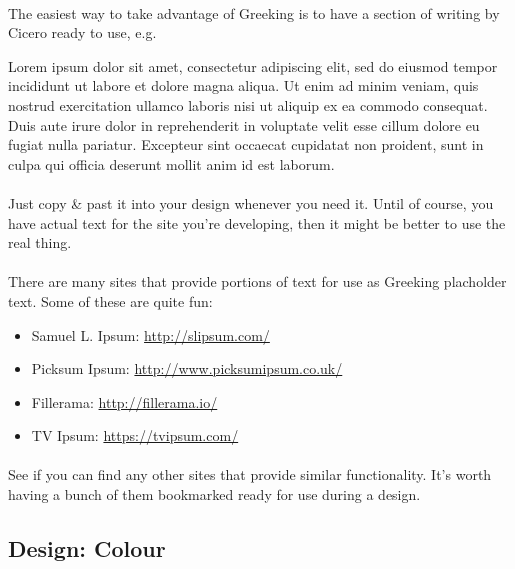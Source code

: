 \documentclass[10pt, a4paper, twosize]{article}
\begin{document}
\paragraph{} The easiest way to take advantage of Greeking is to have a section of writing by Cicero ready to use, e.g. 

\begin{framed}
Lorem ipsum dolor sit amet, consectetur adipiscing elit, sed do eiusmod tempor incididunt ut labore et dolore magna aliqua. Ut enim ad minim veniam, quis nostrud exercitation ullamco laboris nisi ut aliquip ex ea commodo consequat. Duis aute irure dolor in reprehenderit in voluptate velit esse cillum dolore eu fugiat nulla pariatur. Excepteur sint occaecat cupidatat non proident, sunt in culpa qui officia deserunt mollit anim id est laborum.
\end{framed}


\paragraph{} Just copy \& past it into your design whenever you need it. Until of course, you have actual text for the site you're developing, then it might be better to use the real thing.

\paragraph{} There are many sites that provide portions of text for use as Greeking placholder text. Some of these are quite fun:

\begin{itemize}
\item Samuel L. Ipsum: \url{http://slipsum.com/}
\item Picksum Ipsum: \url{http://www.picksumipsum.co.uk/}
\item Fillerama: \url{http://fillerama.io/}
\item TV Ipsum: \url{https://tvipsum.com/}
\end{itemize}

\paragraph{} See if you can find any other sites that provide similar functionality. It's worth having a bunch of them bookmarked ready for use during a design.

\subsection{Design: Colour}
\end{document}

